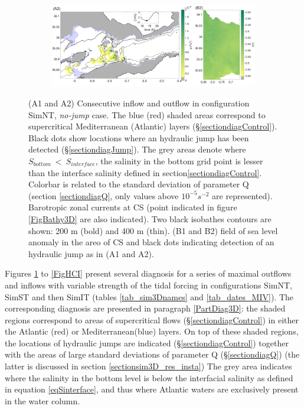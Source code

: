 \begin{figure}[!h]
 \begin{subfigure}{\linewidth}
\centering
\includegraphics[width=\linewidth]{./GBR3D/ME2_13h_p.png}
\end{subfigure}
\caption { (A1 and A2) Consecutive inflow and outflow in configuration SimNT, \textit{no-jump} case. The blue (red) shaded areas correspond to supercritical Mediterranean (Atlantic) layers (\S \ref{sectiondiagControl}). Black dots show locations where an hydraulic jump has been detected (\S \ref{sectiondiagJump}). The grey areas denote where $S_{bottom}\ <\ S_{interface}$, the salinity in the bottom grid point is lesser than the interface salinity defined in section\ref{sectiondiagControl}. Colorbar is related to the standard deviation of parameter Q (section \ref{sectiondiagQ}, only values above $10^{-5} s^{-2}$ are represented). Barotropic zonal currents at CS (point indicated in figure \ref{FigBathy3D} are also indicated). Two black isobathes contours are shown: 200 m (bold) and 400 m (thin). (B1 and B2) field of sea level anomaly in the areo of CS and black dots indicating detection of an hydraulic jump as in (A1 and A2).}
\label{FigHCN}
\end{figure}

Figures \ref{FigHCN} to \ref{FigHCI} present several diagnosis for a series of maximal outflows and inflows with variable strength of the tidal forcing in configurations SimNT, SimST and then SimIT (tables \ref{tab_sim3Dnames} and \ref{tab_dates_MIV}). The corresponding diagnosis are presented in paragraph \ref{PartDiag3D}: the shaded regions correspond to areas of supercritical flows (\S \ref{sectiondiagControl}) in either the Atlantic (red) or Mediterranean(blue) layers. On top of these shaded regions, the locations of hydraulic jumps are indicated (\S \ref{sectiondiagControl}) together with the areas of large standard deviations of parameter Q (\S \ref{sectiondiagQ}) (the latter is discussed in section \ref{sectionsim3D_res_insta}) The grey area indicates where the salinity in the bottom level is below the interfacial salinity as defined in equation \ref{eqSinterface}, and thus where Atlantic waters are exclusively present in the water column. 

